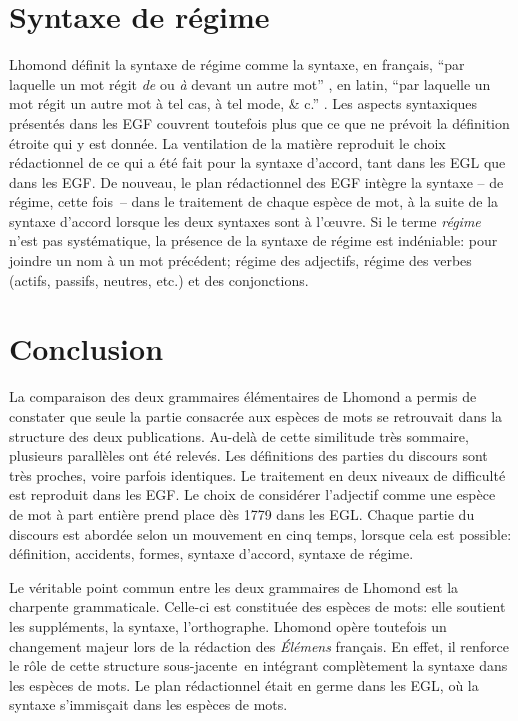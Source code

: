 \documentclass[output=paper]{langsci/langscibook}
\begin{document}
\section{Syntaxe de régime}

Lhomond définit la syntaxe de régime comme la syntaxe, en français, “par laquelle un mot régit \textit{de} ou \textit{à} devant un autre mot” \citep[15]{lhomond_elemens_1790}, en latin, “par laquelle un mot régit un autre mot à tel cas, à tel mode, \& c.” \citep[131]{lhomond_elemens_1781}. Les aspects syntaxiques présentés dans les EGF couvrent toutefois plus que ce que ne prévoit la définition étroite qui y est donnée. La ventilation de la matière reproduit le choix rédactionnel de ce qui a été fait pour la syntaxe d’accord, tant dans les EGL que dans les EGF. De nouveau, le plan rédactionnel des EGF intègre la syntaxe – de régime, cette fois~– dans le traitement de chaque espèce de mot, à la suite de la syntaxe d’accord lorsque les deux syntaxes sont à l’œuvre. Si le terme \textit{régime} n’est pas systématique, la présence de la syntaxe de régime est indéniable: pour joindre un nom à un mot précédent; régime des adjectifs, régime des verbes (actifs, passifs, neutres, etc.) et des conjonctions.

\section{Conclusion}

La comparaison des deux grammaires élémentaires de Lhomond a permis de constater que seule la partie consacrée aux espèces de mots se retrouvait dans la structure des deux publications. Au-delà de cette similitude très sommaire, plusieurs parallèles ont été relevés. Les définitions des parties du discours sont très proches, voire parfois identiques. Le traitement en deux niveaux de difficulté est reproduit dans les EGF. Le choix de considérer l’adjectif comme une espèce de mot à part entière prend place dès 1779 dans les EGL. Chaque partie du discours est abordée selon un mouvement en cinq temps, lorsque cela est possible: définition, accidents, formes, syntaxe d’accord, syntaxe de régime.

Le véritable point commun entre les deux grammaires de Lhomond est la charpente grammaticale. Celle-ci est constituée des espèces de mots: elle soutient les suppléments, la syntaxe, l’orthographe. Lhomond opère toutefois un changement majeur lors de la rédaction des \textit{Élémens} français. En effet, il renforce le rôle de cette structure sous-jacente~en intégrant complètement la syntaxe dans les espèces de mots. Le plan rédactionnel était en germe dans les EGL, où la syntaxe s’immisçait dans les espèces de mots. 
\end{document}
